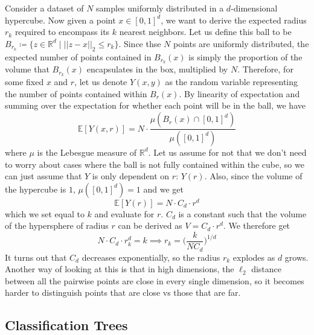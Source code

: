 \documentclass{article}
\begin{document}
    \begin{example}
      Consider a dataset of $N$ samples uniformly distributed in a $d$-dimensional hypercube. Now given a point $x \in [0, 1]^d$, we want to derive the expected radius $r_k$ required to encompass its $k$ nearest neighbors. Let us define this ball to be $B_{r_k} \coloneqq \{ z \in \mathbb{R}^d \mid ||z - x ||_2 \leq r_k \}$. Since thse $N$ points are uniformly distributed, the expected number of points contained in $B_{r_k} (x)$ is simply the proportion of the volume that $B_{r_k} (x)$ encapsulates in the box, multiplied by $N$. Therefore, for some fixed $x$ and $r$, let us denote $Y(x, y)$ as the random variable representing the number of points contained within $B_r (x)$. By linearity of expectation and summing over the expectation for whether each point will be in the ball, we have 
      \[\mathbb{E}[Y (x, r)] = N \cdot \frac{\mu(B_r (x) \cap [0, 1]^d) }{\mu([0, 1]^d)}\]
      where $\mu$ is the Lebesgue measure of $\mathbb{R}^d$. Let us assume for not that we don't need to worry about cases where the ball is not fully contained within the cube, so we can just assume that $Y$ is only dependent on $r$: $Y(r)$. Also, since the volume of the hypercube is $1$,  $\mu([0, 1]^d) = 1$ and we get 
      \[\mathbb{E}[Y(r)] = N \cdot C_d \cdot r^d\]
      which we set equal to $k$ and evaluate for $r$. $C_d$ is a constant such that the volume of the hypersphere of radius $r$ can be derived as $V = C_d \cdot r^d$. We therefore get 
      \[N \cdot C_d \cdot r_k^d = k \implies r_k = \bigg( \frac{k}{N C_d} \bigg)^{1/d}\]
      It turns out that $C_d$ decreases exponentially, so the radius $r_k$ explodes as $d$ grows. Another way of looking at this is that in high dimensions, the $\ell_2$ distance between all the pairwise points are close in every single dimension, so it becomes harder to distinguish points that are close vs those that are far.  
    \end{example} 

  \subsection{Classification Trees}
\end{document}
